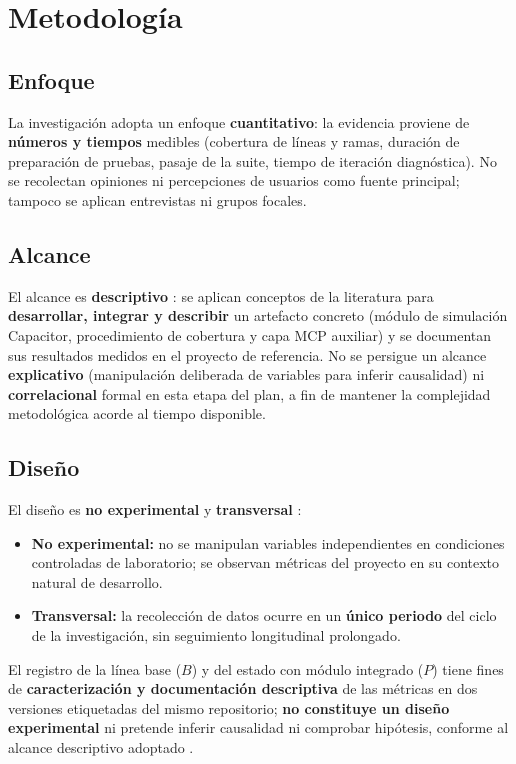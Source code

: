 \section{Metodología}
\label{chap:metodologia}

\subsection{Enfoque}
\label{sec:enfoque}
La investigación adopta un enfoque \textbf{cuantitativo}: la evidencia proviene de \textbf{números y tiempos} medibles (cobertura de líneas y ramas, duración de preparación de pruebas, pasaje de la suite, tiempo de iteración diagnóstica). No se recolectan opiniones ni percepciones de usuarios como fuente principal; tampoco se aplican entrevistas ni grupos focales.

\subsection{Alcance}
\label{sec:alcance_metodologico}
El alcance es \textbf{descriptivo} \cite{sampieri2023metodologia}: se aplican conceptos de la literatura para \textbf{desarrollar, integrar y describir} un artefacto concreto (módulo de simulación Capacitor, procedimiento de cobertura y capa MCP auxiliar) y se documentan sus resultados medidos en el proyecto de referencia. No se persigue un alcance \textbf{explicativo} (manipulación deliberada de variables para inferir causalidad) ni \textbf{correlacional} formal en esta etapa del plan, a fin de mantener la complejidad metodológica acorde al tiempo disponible.

\subsection{Diseño}
\label{sec:diseno}
El diseño es \textbf{no experimental} y \textbf{transversal} \cite{sampieri2023metodologia}:
\begin{itemize}
    \item \textbf{No experimental:} no se manipulan variables independientes en condiciones controladas de laboratorio; se observan métricas del proyecto en su contexto natural de desarrollo.
    \item \textbf{Transversal:} la recolección de datos ocurre en un \textbf{único periodo} del ciclo de la investigación, sin seguimiento longitudinal prolongado.
\end{itemize}
El registro de la línea base ($B$) y del estado con módulo integrado ($P$) tiene fines de \textbf{caracterización y documentación descriptiva} de las métricas en dos versiones etiquetadas del mismo repositorio; \textbf{no constituye un diseño experimental} ni pretende inferir causalidad ni comprobar hipótesis, conforme al alcance descriptivo adoptado \cite{sampieri2023metodologia}.

